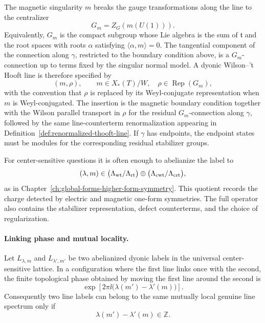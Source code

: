 The magnetic singularity \(m\) breaks the gauge transformations along the
line to the centralizer
\[
  G_m=Z_G(m(U(1))).
\]
Equivalently, \(G_m\) is the compact subgroup whose Lie algebra is the sum of
\(\mathfrak t\) and the root spaces with roots \(\alpha\) satisfying
\(\langle\alpha,m\rangle=0\).  The tangential component of the connection
along \(\gamma\), restricted to the boundary condition above, is a
\(G_m\)-connection up to terms fixed by the singular normal model.  A dyonic
Wilson--'t Hooft line is therefore specified by
\[
  (m,\rho),
  \qquad
  m\in X_*(T)/W,\quad
  \rho\in\operatorname{Rep}(G_m),
\]
with the convention that \(\rho\) is replaced by its Weyl-conjugate
representation when \(m\) is Weyl-conjugated.  The insertion is the magnetic
boundary condition together with the Wilson parallel transport in \(\rho\)
for the residual \(G_m\)-connection along \(\gamma\), followed by the same
line-counterterm renormalization appearing in
Definition~\ref{def:renormalized-thooft-line}.  If \(\gamma\) has endpoints,
the endpoint states must be modules for the corresponding residual
stabilizer groups.

For center-sensitive questions it is often enough to abelianize the label to
\[
  (\lambda,m)\in
  \bigl(\Lambda_{\rm wt}/\Lambda_{\rm rt}\bigr)
  \oplus
  \bigl(\Lambda_{\rm cwt}/\Lambda_{\rm crt}\bigr),
\]
as in Chapter~\ref{ch:global-forms-higher-form-symmetry}.  This quotient
records the charge detected by electric and magnetic one-form symmetries.  The
full operator also contains the stabilizer representation, defect
counterterms, and the choice of regularization.

\paragraph{Linking phase and mutual locality.}
Let \(L_{\lambda,m}\) and \(L_{\lambda',m'}\) be two abelianized dyonic
labels in the universal center-sensitive lattice.  In a configuration where
the first line links once with the second, the finite topological phase
obtained by moving the first line around the second is
\[
  \exp\!\left[
    2\pi\ii\bigl(\lambda(m')-\lambda'(m)\bigr)
  \right].
\]
Consequently two line labels can belong to the same mutually local genuine
line spectrum only if
\begin{equation}
  \lambda(m')-\lambda'(m)\in\mathbb Z .
  \label{eq:thooft-mutual-locality-condition}
\end{equation}

